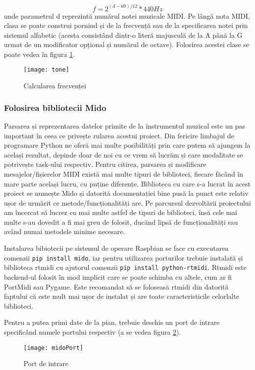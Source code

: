 \documentclass[../IoMusT.tex]{subfiles}
\begin{document}
\[ f = 2^{(d-69)/12} * 440Hz\]
unde parametrul d reprezintă numărul notei muzicale MIDI. Pe lângă nota MIDI, clasa se poate construi pornind și de la frecvență sau de la specificarea notei prin sistemul alfabetic (acesta consistând dintr-o literă majusculă de la A până la G urmat de un modificator opțional și numărul de octave). Folosirea acestei clase se poate vedea în figura \ref{fig:tone}.
\begin{figure}[h]
\centering
\texttt{[image: tone]}
\caption{Calcularea frecvenței}
\label{fig:tone}
\end{figure}

\subsubsection{Folosirea bibliotecii Mido}
Parsarea și reprezentarea datelor primite de la instrumentul muzical este un pas important în ceea ce privește rularea acestui proiect. Din fericire limbajul de programare Python ne oferă mai multe posibilități prin care putem să ajungem la același rezultat, depinde doar de noi cu ce vrem să lucrăm și care modalitate se potrivește task-ului respectiv. Pentru citirea, parsarea și modificare mesajelor/fișierelor MIDI există mai multe tipuri de biblioteci, fiecare făcând în mare parte același lucru, cu puține diferențe. Biblioteca cu care s-a lucrat în acest proiect se numește Mido și datorită documentației bine pusă la punct este relativ ușor de urmărit ce metode/funcționalități are. Pe parcursul dezvoltării proiectului am încercat să lucrez cu mai multe astfel de tipuri de biblioteci, însă cele mai multe s-au dovedit a fi mai greu de folosit, ducănd lipsă de funcționalități sau având numai metodele minime necesare.
\\
\par Instalarea bibiotecii pe sistemul de operare Raspbian se face cu executarea comenzii \verb|pip install mido|, iar pentru utilizarea porturilor trebuie instalată și biblioteca rtmidi cu ajutorul comenzii \verb|pip install python-rtmidi|. Rtmidi este backend-ul folosit în mod implicit care se poate schimba cu altele, cum ar fi PortMidi sau Pygame. Este recomandat să se foloseasă rtmidi din datorită faptului că este mult mai ușor de instalat și are toate caracteristicile celorlalte biblioteci. 
\\
\par Pentru a putea primi date de la pian, trebuie deschis un port de intrare specificând numele portului respectiv (a se vedea figura \ref{fig:port}).
\begin{figure}[h]
\centering
\texttt{[image: midoPort]}
\caption{Port de intrare}
\label{fig:port}
\end{figure}
\end{document}
